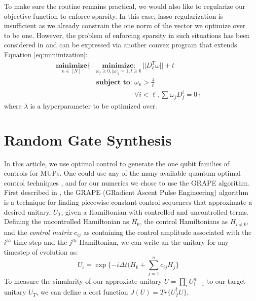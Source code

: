 \documentclass[aps,nofootinbib,pra,notitlepage,twocolumn]{revtex4-1}
\begin{document}
To make sure the routine remains practical, we would also like to regularize our objective function to enforce sparsity. In this case, lasso regularization \cite{tibshirani1996regression} is insufficient as we already constrain the one norm of the vector we optimize over to be one. However, the problem of enforcing sparsity in such situations has been considered in \cite{NIPS2012_4504} and can be expressed via another convex program that extends Equation \ref{eq:minimization}:
\begin{equation}
\begin{split}
\underset{n\in[N]}{\textbf{minimize}}\{
    &\underset{\omega_j\geq0, |\omega|_1=1, t\geq0}{\textbf{minimize}: } ||D_{\ell}^T\omega|| + t\\
    &\textbf{subject to: } \omega_n > \frac{\lambda}{t}\\
    &\phantom{\textbf{subject to: }} \forall i<\ell, \sum \omega_jD_j^i=0\}
\end{split}
\end{equation} where $\lambda$ is a hyperparameter to be optimized over.


\section{Random Gate Synthesis}
\label{sec:random_gate_synthesis}
 In this article, we use optimal control to generate the one qubit families of controls for MUPs. One could use any of the many available quantum optimal control techniques \cite{Khaneja2005, Caneva2011, Machnes2018}, and for our numerics we chose to use the GRAPE algorithm. First described in \cite{Khaneja2005}, the GRAPE (GRadient Ascent Pulse Engineering) algorithm is a technique for finding piecewise constant control sequences that approximate a desired unitary, $U_T$, given a Hamiltonian with controlled and uncontrolled terms. Defining the uncontrolled Hamiltonian as $H_0$, the control Hamiltonians as $H_{i\neq 0}$, and the \textit{control matrix} $c_{ij}$ as containing the control amplitude associated with the $i^{th}$ time step and the $j^{th}$ Hamiltonian, we can write an the unitary for any timestep of evolution as:
\begin{equation}\label{eq:3}
  U_i = \exp\{-i\Delta t(H_0 + \sum_{j=1}^{n}c_{ij}H_{j}\}
\end{equation}
To measure the simularity of our approxiate unitary $U=\prod_iU_{i=1}^n$ to our target unitary $U_T$, we can define a cost function $J(U) = Tr\{U_T^{\dagger}U\}$.
\end{document}
